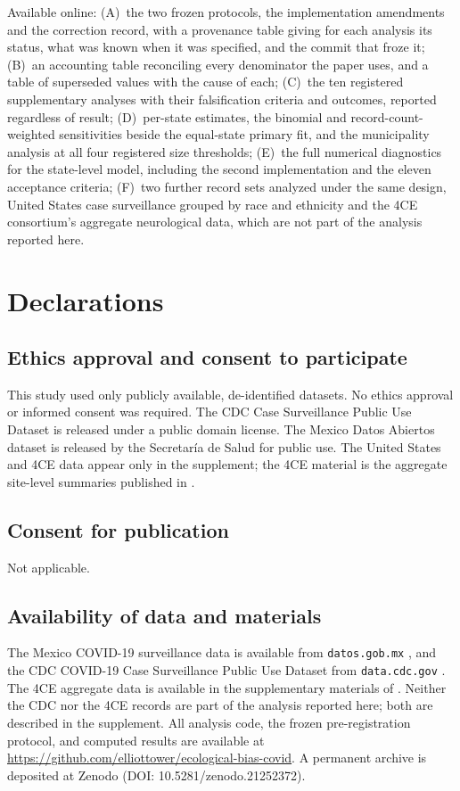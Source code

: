 \documentclass[11pt]{article}
\begin{document}
Available online:
(A)~the two frozen protocols, the implementation amendments and the
correction record, with a provenance table giving for each analysis its
status, what was known when it was specified, and the commit that froze
it;
(B)~an accounting table reconciling every denominator the paper uses,
and a table of superseded values with the cause of each;
(C)~the ten registered supplementary analyses with their falsification
criteria and outcomes, reported regardless of result;
(D)~per-state estimates, the binomial and record-count-weighted
sensitivities beside the equal-state primary fit, and the municipality
analysis at all four registered size thresholds;
(E)~the full numerical diagnostics for the state-level model, including
the second implementation and the eleven acceptance criteria;
(F)~two further record sets analyzed under the same design, United
States case surveillance grouped by race and ethnicity and the 4CE
consortium's aggregate neurological data, which are not part of the
analysis reported here.

\section*{Declarations}

\subsection*{Ethics approval and consent to participate}
This study used only publicly available, de-identified datasets.  No
ethics approval or informed consent was required.  The CDC Case
Surveillance Public Use Dataset is released under a public domain license.
The Mexico Datos Abiertos dataset is released by the Secretar\'{i}a de
Salud for public use.  The United States and 4CE data appear only in the
supplement; the 4CE material is the aggregate site-level summaries
published in \cite{four_ce_neuro2021}.

\subsection*{Consent for publication}
Not applicable.

\subsection*{Availability of data and materials}
The Mexico COVID-19 surveillance data is available from
\texttt{datos.gob.mx} \cite{dataset_mexico_covid}, and the CDC COVID-19
Case Surveillance Public Use Dataset from \texttt{data.cdc.gov}
\cite{dataset_cdc_covid}.  The 4CE aggregate data is available in the supplementary
materials of \cite{four_ce_neuro2021}.  Neither the CDC nor the 4CE
records are part of the analysis reported here; both are described in
the supplement.  All analysis code, the frozen
pre-registration protocol, and computed results are available at
\url{https://github.com/elliottower/ecological-bias-covid}.
A permanent archive is deposited at Zenodo
(DOI: 10.5281/zenodo.21252372).
\end{document}
